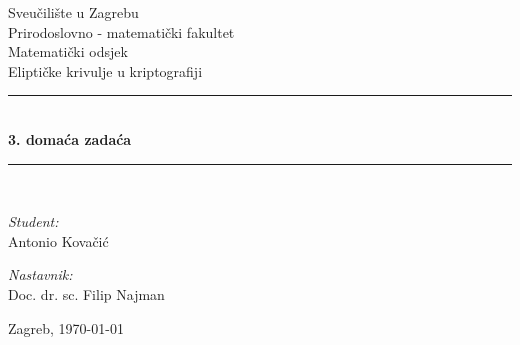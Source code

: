 \documentclass[12pt, a4paper]{article}
\newcommand{\HRule}{\rule{\linewidth}{0.5mm}}
\begin{document}
\renewcommand{\bibname}{Literatura}%
\begin{titlepage}
\begin{center}
\newtheorem{thm}{Teorem}[section] %
\theoremstyle{definition}
\newtheorem{defn}[thm]{Definicija} %
\newtheorem{exmp}[thm]{Primjer} %
\newtheorem{nap}[thm]{Napomena} %

\LARGE Sveučilište u Zagrebu \\[1cm] Prirodoslovno - matematički fakultet \\[1cm] Matematički odsjek\\[3cm]

\Large Eliptičke krivulje u kriptografiji \\[0.5cm]

\HRule \\[0.4cm]
{ \huge \bfseries 3. domaća zadaća}\\[0.4cm]

\HRule \\[9cm]

\begin{minipage}{0.4\textwidth}
\begin{flushleft} \large
\emph{Student:\\}
Antonio Kovačić
\end{flushleft}
\end{minipage}
\begin{minipage}{0.4\textwidth}
\begin{flushright} \large
\emph{Nastavnik:\\}
Doc. dr. sc. Filip Najman
\end{flushright}
\end{minipage}


\vfill

{\large Zagreb, \today}

\end{center}
\end{titlepage}
\pagestyle{plain} %
\setcounter{page}{1}
\begingroup
\let\cleardoublepage\relax
\tableofcontents

\newpage
\end{document}
